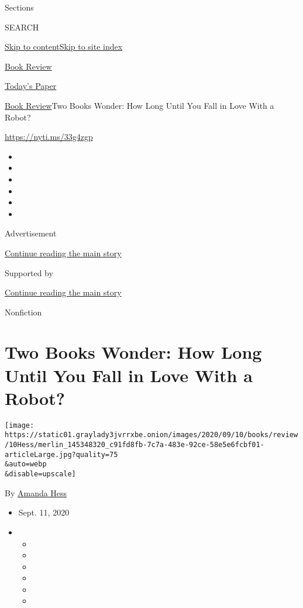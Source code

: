 Sections

SEARCH

\protect\hyperlink{site-content}{Skip to
content}\protect\hyperlink{site-index}{Skip to site index}

\href{https://www.nytimes3xbfgragh.onion/section/books/review}{Book
Review}

\href{https://myaccount.nytimes3xbfgragh.onion/auth/login?response_type=cookie\&client_id=vi}{}

\href{https://www.nytimes3xbfgragh.onion/section/todayspaper}{Today's
Paper}

\href{/section/books/review}{Book Review}\textbar{}Two Books Wonder: How
Long Until You Fall in Love With a Robot?

\url{https://nyti.ms/33g4zgp}

\begin{itemize}
\item
\item
\item
\item
\item
\item
\end{itemize}

Advertisement

\protect\hyperlink{after-top}{Continue reading the main story}

Supported by

\protect\hyperlink{after-sponsor}{Continue reading the main story}

Nonfiction

\hypertarget{two-books-wonder-how-long-until-you-fall-in-love-with-a-robot}{%
\section{Two Books Wonder: How Long Until You Fall in Love With a
Robot?}\label{two-books-wonder-how-long-until-you-fall-in-love-with-a-robot}}

\texttt{[image: https://static01.graylady3jvrrxbe.onion/images/2020/09/10/books/review/10Hess/merlin\_145348320\_c91fd8fb-7c7a-483e-92ce-58e5e6fcbf01-articleLarge.jpg?quality=75\\\&auto=webp\\\&disable=upscale]}

By \href{https://www.nytimes3xbfgragh.onion/by/amanda-hess}{Amanda Hess}

\begin{itemize}
\item
  Sept. 11, 2020
\item
  \begin{itemize}
  \item
  \item
  \item
  \item
  \item
  \item
  \end{itemize}
\end{itemize}


